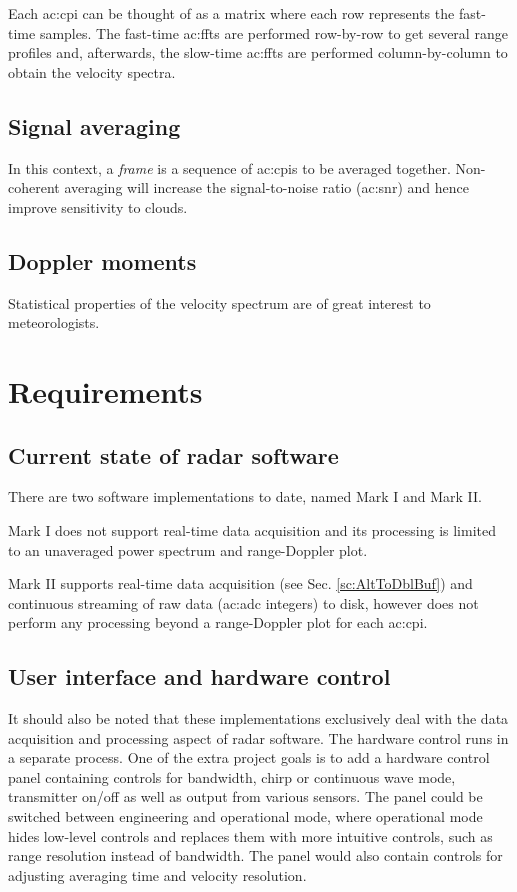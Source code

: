 \documentclass{article}
\begin{document}
Each \acrshort{ac:cpi} can be thought of as a matrix where each row represents the fast-time samples. The fast-time \acrshort{ac:fft}s are performed row-by-row to get several range profiles and, afterwards, the slow-time \acrshort{ac:fft}s are performed column-by-column to obtain the velocity spectra.

\subsection{Signal averaging}
In this context, a \textit{frame} is a sequence of \acrshort{ac:cpi}s to be averaged together. Non-coherent averaging will increase the signal-to-noise ratio (\acrshort{ac:snr}) and hence improve sensitivity to clouds.\supercite{POMRNonCoherentAveraging}

\subsection{Doppler moments}
Statistical properties of the velocity spectrum are of great interest to meteorologists.

\section{Requirements}
\subsection{Current state of radar software}
There are two software implementations to date, named Mark I and Mark II.

Mark I does not support real-time data acquisition and its processing is limited to an unaveraged power spectrum and range-Doppler plot.

Mark II supports real-time data acquisition (see Sec. \ref{sc:AltToDblBuf}) and continuous streaming of raw data (\acrshort{ac:adc} integers) to disk, however does not perform any processing beyond a range-Doppler plot for each \acrshort{ac:cpi}.

\subsection{User interface and hardware control}
It should also be noted that these implementations exclusively deal with the data acquisition and processing aspect of radar software. The hardware control runs in a separate process. One of the extra project goals is to add a hardware control panel containing controls for bandwidth, chirp or continuous wave mode, transmitter on/off as well as output from various sensors. The panel could be switched between engineering and operational mode, where operational mode hides low-level controls and replaces them with more intuitive controls, such as range resolution instead of bandwidth. The panel would also contain controls for adjusting averaging time and velocity resolution.
\end{document}
